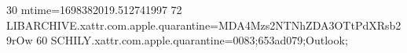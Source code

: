 30 mtime=1698382019.512741997
72 LIBARCHIVE.xattr.com.apple.quarantine=MDA4Mzs2NTNhZDA3OTtPdXRsb29rOw
60 SCHILY.xattr.com.apple.quarantine=0083;653ad079;Outlook;
